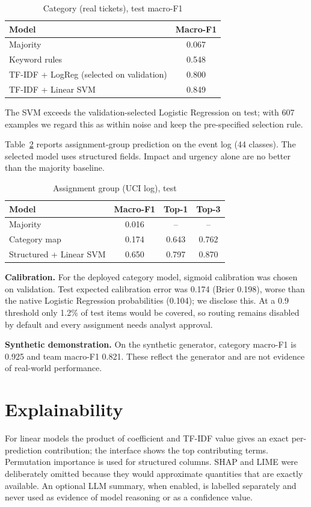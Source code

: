 \documentclass[conference]{IEEEtran}
\begin{document}
\begin{table}[h]
\centering
\caption{Category (real tickets), test macro-F1}
\label{tab:a}
\begin{tabular}{lc}
\toprule
Model & Macro-F1 \\
\midrule
Majority & 0.067 \\
Keyword rules & 0.548 \\
TF-IDF + LogReg (selected on validation) & 0.800 \\
TF-IDF + Linear SVM & 0.849 \\
\bottomrule
\end{tabular}
\end{table}

The SVM exceeds the validation-selected Logistic Regression on test; with 607 examples we regard this as within noise and keep the pre-specified selection rule.

Table~\ref{tab:b} reports assignment-group prediction on the event log (44 classes). The selected model uses structured fields. Impact and urgency alone are no better than the majority baseline.

\begin{table}[h]
\centering
\caption{Assignment group (UCI log), test}
\label{tab:b}
\begin{tabular}{lccc}
\toprule
Model & Macro-F1 & Top-1 & Top-3 \\
\midrule
Majority & 0.016 & -- & -- \\
Category map & 0.174 & 0.643 & 0.762 \\
Structured + Linear SVM & 0.650 & 0.797 & 0.870 \\
\bottomrule
\end{tabular}
\end{table}

\textbf{Calibration.} For the deployed category model, sigmoid calibration was chosen on validation. Test expected calibration error was 0.174 (Brier 0.198), worse than the native Logistic Regression probabilities (0.104); we disclose this. At a 0.9 threshold only 1.2\% of test items would be covered, so routing remains disabled by default and every assignment needs analyst approval.

\textbf{Synthetic demonstration.} On the synthetic generator, category macro-F1 is 0.925 and team macro-F1 0.821. These reflect the generator and are not evidence of real-world performance.

\section{Explainability}
For linear models the product of coefficient and TF-IDF value gives an exact per-prediction contribution; the interface shows the top contributing terms. Permutation importance is used for structured columns. SHAP and LIME were deliberately omitted because they would approximate quantities that are exactly available. An optional LLM summary, when enabled, is labelled separately and never used as evidence of model reasoning or as a confidence value.
\end{document}
